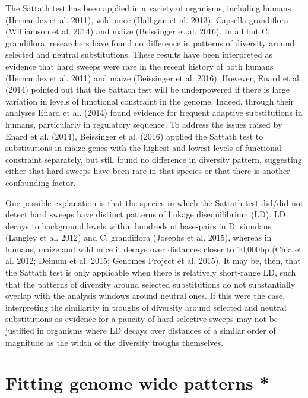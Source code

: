 The Sattath test has been applied in a variety of organisms, including humans (Hernandez et al. 2011), wild mice (Halligan et al. 2013), Capsella grandiflora (Williamson et al. 2014) and maize (Beissinger et al. 2016). In all but C. grandiflora, researchers have found no difference in patterns of diversity around selected and neutral substitutions. These results have been interpreted as evidence that hard sweeps were rare in the recent history of both humans (Hernandez et al. 2011) and maize (Beissinger et al. 2016). However, Enard et al. (2014) pointed out that the Sattath test will be underpowered if there is large variation in levels of functional constraint in the genome. Indeed, through their analyses Enard et al. (2014) found evidence for frequent adaptive substitutions in humans, particularly in regulatory sequence. To address the issues raised by Enard et al. (2014), Beissinger et al. (2016) applied the Sattath test to substitutions in maize genes with the highest and lowest levels of functional constraint separately, but still found no difference in diversity pattern, suggesting either that hard sweeps have been rare in that species or that there is another confounding factor.
 
One possible explanation is that the species in which the Sattath test did/did not detect hard sweeps have distinct patterns of linkage disequilibrium (LD). LD decays to background levels within hundreds of base-pairs in D. simulans (Langley et al. 2012) and C. grandiflora (Josephs et al. 2015), whereas in humans, maize and wild mice it decays over distances closer to 10,000bp (Chia et al. 2012; Deinum et al. 2015; Genomes Project et al. 2015). It may be, then, that the Sattath test is only applicable when there is relatively short-range LD, such that the patterns of diversity around selected substitutions do not substantially overlap with the analysis windows around neutral ones. If this were the case, interpreting the similarity in troughs of diversity around selected and neutral substitutions as evidence for a paucity of hard selective sweeps may not be justified in organisms where LD decays over distances of a similar order of magnitude as the width of the diversity troughs themselves.
   	        	  
\section[Fitting genome wide patterns]{Fitting genome wide patterns *}

